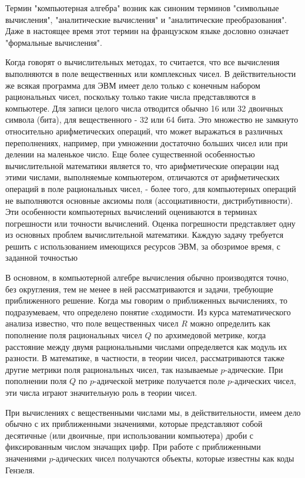 \documentclass[master, och, diploma, times]{sty/SCWorks}
\theoremstyle{plain}
\theoremstyle{definition}
\begin{document}
Термин "компьютерная алгебра" возник как синоним терминов "символьные вычисления", "аналитические вычисления" и  "аналитические преобразования". Даже в настоящее время этот термин на французском языке дословно означает "формальные вычисления".

Когда говорят о вычислительных методах, то считается, что все вычисления выполняются в поле вещественных или комплексных чисел. В действительности же всякая программа для ЭВМ имеет дело только с конечным набором рациональных чисел, поскольку только такие числа представляются в компьютере. Для записи целого числа отводится обычно 16 или 32 двоичных символа (бита), для вещественного - 32 или 64 бита. Это множество не замкнуто относительно арифметических операций, что может выражаться в различных переполнениях, например, при умножении достаточно больших чисел или при делении на маленькое число. Еще более существенной особенностью вычислительной математики является то, что арифметические операции над этими числами, выполняемые компьютером, отличаются от арифметических операций в поле рациональных чисел, - более того, для компьютерных операций не выполняются основные аксиомы поля (ассоциативности, дистрибутивности). Эти особенности компьютерных вычислений оцениваются в терминах погрешности или точности вычислений. Оценка погрешности представляет одну из основных проблем вычислительной математики. Каждую задачу требуется решить с использованием имеющихся ресурсов ЭВМ, за обозримое время, с заданной точностью

В основном, в компьютерной алгебре вычисления обычно производятся точно, без округления, тем не менее в ней рассматриваются и задачи, требующие приближенного решение. Когда мы говорим о приближенных вычислениях, то подразумеваем, что определено понятие cходимости. Из курса математического анализа известно, что поле вещественных чисел $R$ можно определить как пополнение поля рациональных чисел $Q$ по архимедовой метрике, когда расстояние между двумя рациональными числами определяется как модуль их разности. В математике, в частности, в теории чисел, рассматриваются также другие метрики поля рациональных чисел, так называемые $p$-адические. При пополнении поля $Q$ по $p$-адической метрике получается поле $p$-адических чисел, эти числа играют значительную роль в теории чисел.

При вычислениях с вещественными числами мы, в действительности, имеем дело обычно с их приближенными значениями, которые представляют собой десятичные (или двоичные, при использовании компьютера) дроби с фиксированным числом значащих цифр. При работе с приближенными значениями $p$-адических чисел получаются объекты, которые известны как коды Гензеля.
\end{document}

